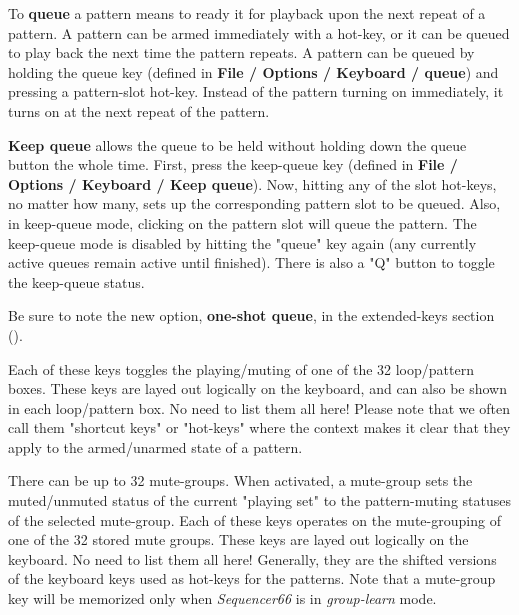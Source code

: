 %
%
%


   To \textbf{queue}
   a pattern means to ready it for playback upon the next repeat
   of a pattern.  A pattern can be armed immediately with a hot-key,
   or it can be queued to play back the next time the pattern repeats.
   A pattern can be queued by holding the queue key (defined in
   \textbf{File / Options / Keyboard / queue}) and pressing a pattern-slot
   hot-key.  Instead of the pattern turning on
   immediately, it turns on at the next repeat of the pattern.

   \textbf{Keep queue}
   allows the queue to be held without holding
   down the queue button the whole time.  First, press the keep-queue key
   (defined in \textbf{File / Options / Keyboard / Keep queue}).  Now, hitting
   any of the slot hot-keys, no matter how many, sets up the corresponding
   pattern slot to be queued.  Also, in keep-queue mode, clicking on the
   pattern slot will queue the pattern.  The keep-queue mode is disabled by
   hitting the "queue" key again (any currently active queues remain active
   until finished).  There is also a "Q" button to toggle the keep-queue
   status.

   Be sure to note the new option, \textbf{one-shot queue}, in the
   extended-keys section ().

   Each of these keys toggles the playing/muting of one of the 32
   loop/pattern boxes.  These keys are layed out logically on the keyboard,
   and can also be shown in each loop/pattern box.  No need to list them all
   here!  Please note that we often call them "shortcut keys" or
   "hot-keys" where the context
   makes it clear that they apply to the armed/unarmed state of a pattern.

   There can be up to 32 mute-groups.
   When activated, a mute-group
   sets the muted/unmuted status of the current "playing set"
   to the pattern-muting statuses of the selected mute-group.
   Each of these keys operates on the mute-grouping of one of the 32
   stored mute groups.
   These keys are layed out logically on the keyboard.
   No need to list them all here!
   Generally, they are the shifted versions of the
   keyboard keys used as hot-keys for the patterns.
   Note that a mute-group key will be memorized only when
   \textsl{Sequencer66} is in
    \textsl{group-learn} mode.

